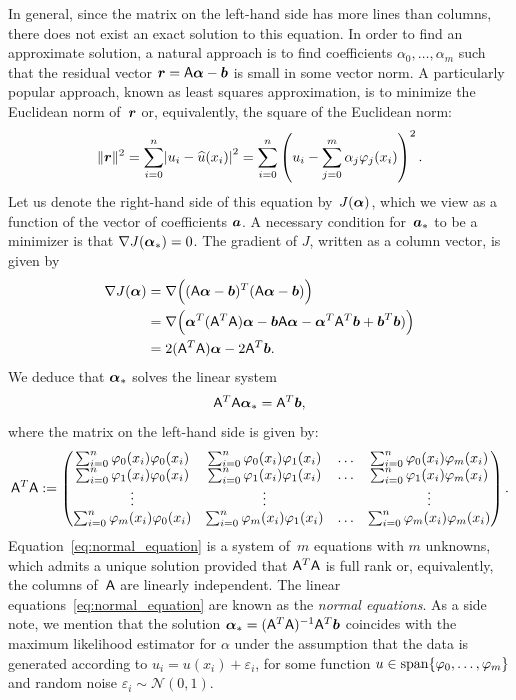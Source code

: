 In general,
since the matrix on the left-hand side has more lines than columns,
there does not exist an exact solution to this equation.
In order to find an approximate solution,
a natural approach is to find coefficients $\alpha_0, \dotsc, \alpha_m$ such that
the residual vector $\mathbf{\boldsymbol{r}} = \mathsf A \mathbf{\boldsymbol{\alpha}} - \mathbf{\boldsymbol{b}}$ is small in some vector norm.
A particularly popular approach,
known as least squares approximation,
is to minimize the Euclidean norm of~$\mathbf{\boldsymbol{r}}$ or,
equivalently, the square of the Euclidean norm:
\[
    \norm{\vect r}^2 = \sum_{i=0}^{n} \abs[big]{u_i - \widehat u(x_i)}^2 = \sum_{i=0}^{n} \left( u_i - \sum_{j=0}^{m} \alpha_j \varphi_j(x_i) \right)^2.
\]
Let us denote the right-hand side of this equation by~$J(\mathbf{\boldsymbol{\alpha}})$,
which we view as a function of the vector of coefficients $\mathbf{\boldsymbol{a}}$.
A necessary condition for~$\mathbf{\boldsymbol{a}}_*$ to be a minimizer is that $\nabla J(\mathbf{\boldsymbol{\alpha}}_*) = 0$.
The gradient of $J$,
written as a column vector, is given by
\begin{align*}
    \nabla J(\mathbf{\boldsymbol{\alpha}})
    &= \nabla \Bigl( (\mathsf A \mathbf{\boldsymbol{\alpha}} - \mathbf{\boldsymbol{b}})^T (\mathsf A \mathbf{\boldsymbol{\alpha}} - \mathbf{\boldsymbol{b}}) \Bigr) \\
    &= \nabla \Bigl( \mathbf{\boldsymbol{\alpha}}^T (\mathsf A^T \mathsf A) \mathbf{\boldsymbol{\alpha}} - \mathbf{\boldsymbol{b}} \mathsf A  \mathbf{\boldsymbol{\alpha}} - \mathbf{\boldsymbol{\alpha}}^T \mathsf A^T \mathbf{\boldsymbol{b}} + \mathbf{\boldsymbol{b}}^T \mathbf{\boldsymbol{b}}) \Bigr) \\
    &= 2 (\mathsf A^T \mathsf A) \mathbf{\boldsymbol{\alpha}} - 2 \mathsf A^T \mathbf{\boldsymbol{b}}.
\end{align*}
We deduce that $\mathbf{\boldsymbol{\alpha}}_*$ solves the linear system
\begin{equation}
    \label{eq:normal_equation}
    \mathsf A^T \mathsf A \mathbf{\boldsymbol{\alpha}}_* = \mathsf A^T \mathbf{\boldsymbol{b}},
\end{equation}
where the matrix on the left-hand side is given by:
\[
    \mathsf A^T \mathsf A :=
    \begin{pmatrix}
        \sum_{i=0}^{n} \varphi_0(x_i) \varphi_0(x_i) & \sum_{i=0}^{n} \varphi_0(x_i) \varphi_1(x_i) & \hdots & \sum_{i=0}^{n} \varphi_0(x_i) \varphi_m(x_i) \\
        \sum_{i=0}^{n} \varphi_1(x_i) \varphi_0(x_i) & \sum_{i=0}^{n} \varphi_1(x_i) \varphi_1(x_i) & \hdots & \sum_{i=0}^{n} \varphi_1(x_i) \varphi_m(x_i) \\
        \vdots & \vdots & & \vdots \\
        \sum_{i=0}^{n} \varphi_m(x_i) \varphi_0(x_i) & \sum_{i=0}^{n} \varphi_m(x_i) \varphi_1(x_i) & \hdots & \sum_{i=0}^{n} \varphi_m(x_i) \varphi_m(x_i)
    \end{pmatrix}.
\]
Equation~\eqref{eq:normal_equation} is a system of~$m$ equations with $m$ unknowns,
which admits a unique solution provided that $\mathsf A^T \mathsf A$ is full rank or,
equivalently, the columns of~$\mathsf A$ are linearly independent.
The linear equations~\eqref{eq:normal_equation} are known as the \emph{normal equations}.
As a side note,
we mention that
the solution $\mathbf{\boldsymbol{\alpha}}_* = (\mathsf A^T \mathsf A)^{-1} \mathsf A^T \mathbf{\boldsymbol{b}}$
coincides with the maximum likelihood estimator for $\alpha$ under the assumption that the data is generated according to
$u_i = u(x_i) + \varepsilon_i$, for some function $u \in \operatorname{span} \{\varphi_0, \dotsc, \varphi_m\}$
and random noise $\varepsilon_i \sim \mathcal N(0, 1)$.

